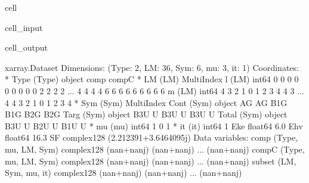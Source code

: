 \documentclass[letterpaper,table,10pt,english]{jupyterBook}
\begin{document}
\begin{sphinxuseclass}{cell}\begin{sphinxVerbatimInput}

\begin{sphinxuseclass}{cell_input}
\begin{sphinxVerbatim}[commandchars=\\\{\}]
\PYG{p}{[}\PYG{p}{]}\PYG{p}{[}\PYG{p}{]}
\end{sphinxVerbatim}

\end{sphinxuseclass}\end{sphinxVerbatimInput}
\begin{sphinxVerbatimOutput}

\begin{sphinxuseclass}{cell_output}
\begin{sphinxVerbatim}[commandchars=\\\{\}]
\PYGZlt{}xarray.Dataset\PYGZgt{}
Dimensions:  (Type: 2, LM: 36, Sym: 6, mu: 3, it: 1)
Coordinates:
  * Type     (Type) object \PYGZsq{}comp\PYGZsq{} \PYGZsq{}compC\PYGZsq{}
  * LM       (LM) MultiIndex
  \PYGZhy{} l        (LM) int64 0 0 0 0 0 0 0 0 0 2 2 2 2 ... 4 4 4 4 6 6 6 6 6 6 6 6 6
  \PYGZhy{} m        (LM) int64 \PYGZhy{}4 \PYGZhy{}3 \PYGZhy{}2 \PYGZhy{}1 0 1 2 3 4 \PYGZhy{}4 \PYGZhy{}3 ... 4 \PYGZhy{}4 \PYGZhy{}3 \PYGZhy{}2 \PYGZhy{}1 0 1 2 3 4
  * Sym      (Sym) MultiIndex
  \PYGZhy{} Cont     (Sym) object \PYGZsq{}AG\PYGZsq{} \PYGZsq{}AG\PYGZsq{} \PYGZsq{}B1G\PYGZsq{} \PYGZsq{}B1G\PYGZsq{} \PYGZsq{}B2G\PYGZsq{} \PYGZsq{}B2G\PYGZsq{}
  \PYGZhy{} Targ     (Sym) object \PYGZsq{}B3U\PYGZsq{} \PYGZsq{}U\PYGZsq{} \PYGZsq{}B3U\PYGZsq{} \PYGZsq{}U\PYGZsq{} \PYGZsq{}B3U\PYGZsq{} \PYGZsq{}U\PYGZsq{}
  \PYGZhy{} Total    (Sym) object \PYGZsq{}B3U\PYGZsq{} \PYGZsq{}U\PYGZsq{} \PYGZsq{}B2U\PYGZsq{} \PYGZsq{}U\PYGZsq{} \PYGZsq{}B1U\PYGZsq{} \PYGZsq{}U\PYGZsq{}
  * mu       (mu) int64 \PYGZhy{}1 0 1
  * it       (it) int64 1
    Eke      float64 6.0
    Ehv      float64 16.3
    SF       complex128 (2.212391+3.6464095j)
Data variables:
    comp     (Type, mu, LM, Sym) complex128 (nan+nanj) (nan+nanj) ... (nan+nanj)
    compC    (Type, mu, LM, Sym) complex128 (nan+nanj) (nan+nanj) ... (nan+nanj)
    subset   (LM, Sym, mu, it) complex128 (nan+nanj) (nan+nanj) ... (nan+nanj)
\end{sphinxVerbatim}

\end{sphinxuseclass}\end{sphinxVerbatimOutput}

\end{sphinxuseclass}
\end{document}
